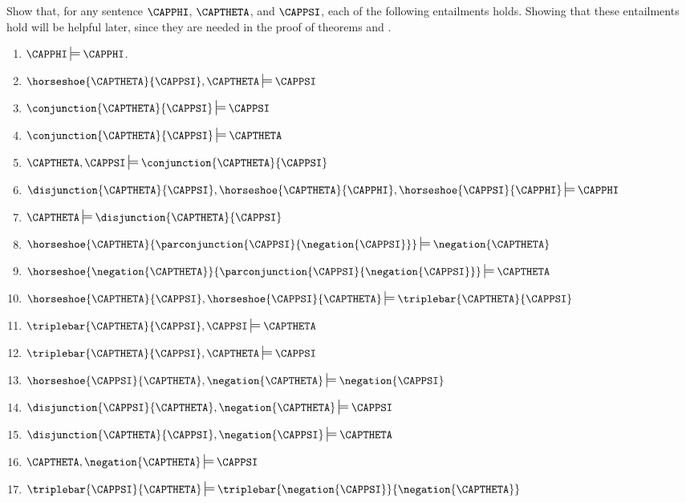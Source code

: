 Show that, for any \GSL{} sentence $\CAPPHI$, $\CAPTHETA$, and $\CAPPSI$, each of the following entailments holds.
Showing that these entailments hold will be helpful later, since they are needed in the proof of theorems  and .
\begin{multicols}{2}
\begin{enumerate}
\item $\CAPPHI\sdtstile{}{}\CAPPHI$.
\item $\horseshoe{\CAPTHETA}{\CAPPSI},\CAPTHETA\sdtstile{}{}\CAPPSI$
\item $\conjunction{\CAPTHETA}{\CAPPSI}\sdtstile{}{}\CAPPSI$
\item $\conjunction{\CAPTHETA}{\CAPPSI}\sdtstile{}{}\CAPTHETA$
\item $\CAPTHETA,\CAPPSI\sdtstile{}{}\conjunction{\CAPTHETA}{\CAPPSI}$
\item $\disjunction{\CAPTHETA}{\CAPPSI},\horseshoe{\CAPTHETA}{\CAPPHI},\horseshoe{\CAPPSI}{\CAPPHI}\sdtstile{}{}\CAPPHI$
\item $\CAPTHETA\sdtstile{}{}\disjunction{\CAPTHETA}{\CAPPSI}$
\item $\horseshoe{\CAPTHETA}{\parconjunction{\CAPPSI}{\negation{\CAPPSI}}}\sdtstile{}{}\negation{\CAPTHETA}$
\item $\horseshoe{\negation{\CAPTHETA}}{\parconjunction{\CAPPSI}{\negation{\CAPPSI}}}\sdtstile{}{}\CAPTHETA$
\item $\horseshoe{\CAPTHETA}{\CAPPSI},\horseshoe{\CAPPSI}{\CAPTHETA}\sdtstile{}{}\triplebar{\CAPTHETA}{\CAPPSI}$
\item $\triplebar{\CAPTHETA}{\CAPPSI},\CAPPSI\sdtstile{}{}\CAPTHETA$
\item $\triplebar{\CAPTHETA}{\CAPPSI},\CAPTHETA\sdtstile{}{}\CAPPSI$
\item $\horseshoe{\CAPPSI}{\CAPTHETA},\negation{\CAPTHETA}\sdtstile{}{}\negation{\CAPPSI}$
\item $\disjunction{\CAPPSI}{\CAPTHETA},\negation{\CAPTHETA}\sdtstile{}{}\CAPPSI$
\item $\disjunction{\CAPTHETA}{\CAPPSI},\negation{\CAPPSI}\sdtstile{}{}\CAPTHETA$
\item $\CAPTHETA,\negation{\CAPTHETA}\sdtstile{}{}\CAPPSI$
\item $\triplebar{\CAPPSI}{\CAPTHETA}\sdtstile{}{}\triplebar{\negation{\CAPPSI}}{\negation{\CAPTHETA}}$
\end{enumerate}
\end{multicols}

